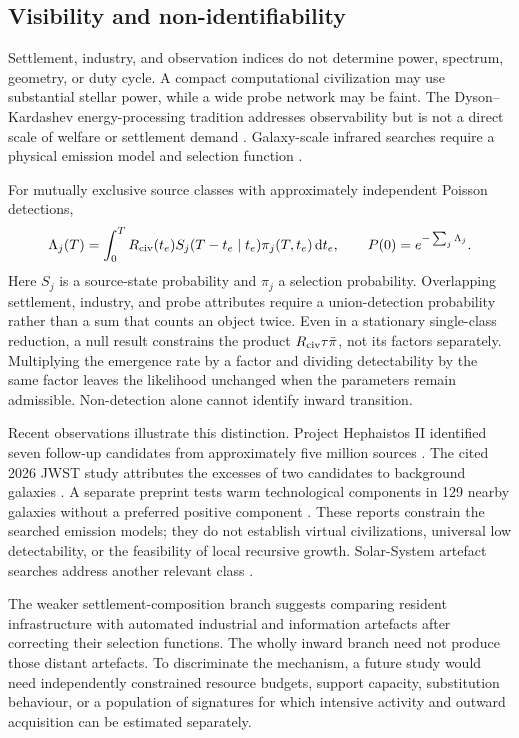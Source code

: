 \documentclass[11pt,a4paper]{article}
\theoremstyle{definition}\newtheorem{definition}{Definition}
\newcommand{\dd}{\,\mathrm{d}}
\begin{document}
\subsection{Visibility and non-identifiability}

Settlement, industry, and observation indices do not determine power, spectrum, geometry, or duty cycle. A compact computational civilization may use substantial stellar power, while a wide probe network may be faint. The Dyson--Kardashev energy-processing tradition addresses observability but is not a direct scale of welfare or settlement demand \citep{Dyson1960,Kardashev1964}. Galaxy-scale infrared searches require a physical emission model and selection function \citep{Wright2014a,Wright2014b}.

For mutually exclusive source classes with approximately independent Poisson detections,
\begin{equation}
 \Lambda_j(T)=\int_0^T R_{\rm civ}(t_e)S_j(T-t_e\mid t_e)\pi_j(T,t_e)\dd t_e,
 \qquad P(0)=e^{-\sum_j\Lambda_j}.
 \label{eq:observations}
\end{equation}
Here $S_j$ is a source-state probability and $\pi_j$ a selection probability. Overlapping settlement, industry, and probe attributes require a union-detection probability rather than a sum that counts an object twice. Even in a stationary single-class reduction, a null result constrains the product $R_{\rm civ}\tau\bar\pi$, not its factors separately. Multiplying the emergence rate by a factor and dividing detectability by the same factor leaves the likelihood unchanged when the parameters remain admissible. Non-detection alone cannot identify inward transition.

Recent observations illustrate this distinction. Project Hephaistos II identified seven follow-up candidates from approximately five million sources \citep{Suazo2024}. The cited 2026 JWST study attributes the excesses of two candidates to background galaxies \citep{Zackrisson2026}. A separate preprint tests warm technological components in 129 nearby galaxies without a preferred positive component \citep{Curtis2026}. These reports constrain the searched emission models; they do not establish virtual civilizations, universal low detectability, or the feasibility of local recursive growth. Solar-System artefact searches address another relevant class \citep{Freitas1983,HaqqMisraKopparapu2012}.

The weaker settlement-composition branch suggests comparing resident infrastructure with automated industrial and information artefacts after correcting their selection functions. The wholly inward branch need not produce those distant artefacts. To discriminate the mechanism, a future study would need independently constrained resource budgets, support capacity, substitution behaviour, or a population of signatures for which intensive activity and outward acquisition can be estimated separately. 
\end{document}
